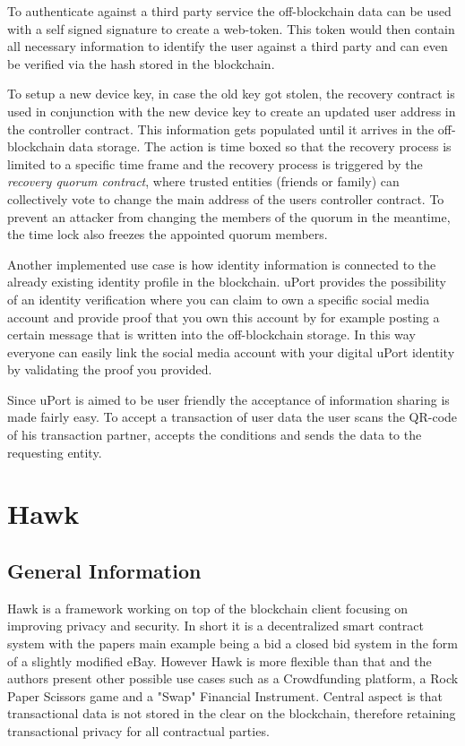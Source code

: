 To authenticate against a third party service the off-blockchain data can be used with a self signed signature to create a web-token. This token would then contain all necessary information to identify the user against a third party and can even be verified via the hash stored in the blockchain.

To setup a new device key, in case the old key got stolen, the recovery contract is used in conjunction with the new device key to create an updated user address in the controller contract. This information gets populated until it arrives in the off-blockchain data storage. The action is time boxed so that the recovery process is limited to a specific time frame and the recovery process is triggered by the \textit{recovery quorum contract}, where trusted entities (friends or family) can collectively vote to change the main address of the users controller contract. To prevent an attacker from changing the members of the quorum in the meantime, the time lock also freezes the appointed quorum members.

Another implemented use case is how identity information is connected to the already existing identity profile in the blockchain. uPort provides the possibility of an identity verification where you can claim to own a specific social media account and provide proof that you own this account by for example posting a certain message that is written into the off-blockchain storage. In this way everyone can easily link the social media account with your digital uPort identity by validating the proof you provided.

Since uPort is aimed to be user friendly the acceptance of information sharing is made fairly easy. To accept a transaction of user data the user scans the QR-code of his transaction partner, accepts the conditions and sends the data to the requesting entity.

\section{Hawk}
\subsection{General Information}
Hawk is a framework working on top of the blockchain client focusing on improving privacy and security. In short it is a decentralized smart contract system with the papers main example being a bid a closed bid system in the form of a slightly modified eBay.\cite[p.840]{Hawk} However Hawk is more flexible than that and the authors present other possible use cases such as a Crowdfunding platform, a Rock Paper Scissors game and a "Swap" Financial Instrument.\cite[p.852]{Hawk} Central aspect is that transactional data is not stored in the clear on the blockchain, therefore retaining transactional privacy for all contractual parties.\cite[p.840]{Hawk}

